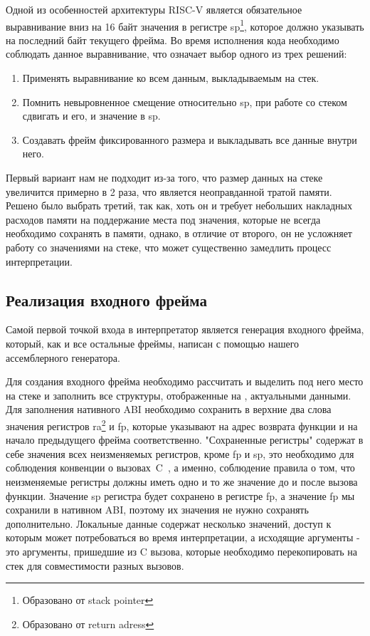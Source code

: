     Одной из особенностей архитектуры RISC-V является обязательное выравнивание вниз на 16 байт значения в регистре sp\footnote{Образовано от stack pointer}, которое должно указывать на последний байт текущего фрейма. Во время исполнения кода необходимо соблюдать данное выравнивание, что означает выбор одного из трех решений:
\begin{enumerate}
    \item Применять выравнивание ко всем данным, выкладываемым на стек.
    \item Помнить невыровненное смещение относительно sp, при работе со стеком сдвигать и его, и значение в sp.
    \item Создавать фрейм фиксированного размера и выкладывать все данные внутри него.
\end{enumerate}

Первый вариант нам не подходит из-за того, что размер данных на стеке увеличится примерно в 2 раза, что является неоправданной тратой памяти. Решено было выбрать третий, так как, хоть он и требует небольших накладных расходов памяти на поддержание места под значения, которые не всегда необходимо сохранять в памяти, однако, в отличие от второго, он не усложняет работу со значениями на стеке, что может существенно замедлить процесс интерпретации.

\subsection{Реализация входного фрейма}

Самой первой точкой входа в интерпретатор является генерация входного фрейма, который, как и все остальные фреймы, написан с помощью нашего ассемблерного генератора. 

Для создания входного фрейма необходимо рассчитать и выделить под него место на стеке и заполнить все структуры, отображенные на , актуальными данными. Для заполнения нативного ABI необходимо сохранить в верхние два слова значения регистров ra\footnote{Образовано от return adress} и fp, которые указывают на адрес возврата функции и на начало предыдущего фрейма соответственно. "Сохраненные регистры" содержат в себе значения всех неизменяемых регистров, кроме fp и sp, это необходимо для соблюдения конвенции о вызовах~C~\cite{riscv:convention}, а именно, соблюдение правила о том, что неизменяемые регистры должны иметь одно и то же значение до и после вызова функции. Значение sp регистра будет сохранено в регистре fp, а значение fp мы сохранили в нативном ABI, поэтому их значения не нужно сохранять дополнительно. Локальные данные содержат несколько значений, доступ к которым может потребоваться во время интерпретации, а исходящие аргументы - это аргументы, пришедшие из C вызова, которые необходимо перекопировать на стек для совместимости разных вызовов.
 
